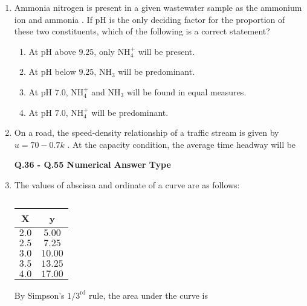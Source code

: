 \documentclass[journal,12pt,onecolumn]{article}
\theoremstyle{remark}
\begin{document}
\begin{enumerate}
\item Ammonia nitrogen is present in a given wastewater sample as the ammonium ion  and ammonia . If pH is the only deciding factor for the proportion of these two constituents, which of the following is a correct statement?

\hfill{}
\begin{enumerate}
    \item At pH above $9.25$, only $\text{NH}_4^+$ will be present.
    \item At pH below $9.25$, $\text{NH}_3$ will be predominant.
    \item At pH $7.0$, $\text{NH}_4^+$ and $\text{NH}_3$ will be found in equal measures.
    \item At pH $7.0$, $\text{NH}_4^+$ will be predominant.
\end{enumerate}

\item On a road, the speed-density relationship of a traffic stream is given by $u = 70-0.7k$ . At the capacity condition, the average time headway will be

\hfill{}
\begin{enumerate}
\end{enumerate}

\textbf{Q.36 - Q.55 Numerical Answer Type}
\item The values of abscissa  and ordinate  of a curve are as follows:
\begin{table}[H]
    \centering
    \begin{tabular}{|c|c|}
    \hline
    \textbf{X} & \textbf{y} \\
    \hline
    $2.0$ & $5.00$ \\
    \hline
    $2.5$ & $7.25$ \\
    \hline
    $3.0$ & $10.00$ \\
    \hline
    $3.5$ & $13.25$ \\
    \hline
    $4.0$ & $17.00$ \\
    \hline
    \end{tabular}
    \caption{}
    \label{tab:q36}
\end{table}
By Simpson's $1/3^{\text{rd}}$ rule, the area under the curve  is \underline{\hspace{2cm}}


\end{enumerate}
\end{document}
